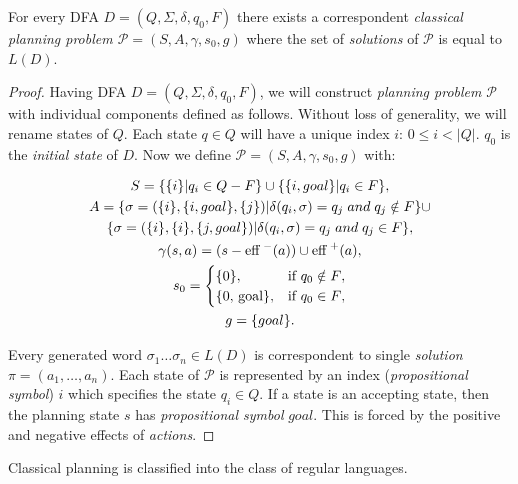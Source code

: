 \begin{thm}\label{thm02:2}
    For every DFA $D = (Q, \Sigma, \delta, q_0, F)$ there exists a correspondent \emph{classical planning problem $\mathcal{P} = (S, A, \gamma, s_0, g)$} where the set of \emph{solutions} of $\mathcal{P}$ is equal to $L(D)$.
\end{thm}
\begin{proof}
    Having DFA $D = (Q, \Sigma, \delta, q_0, F)$, we will construct \emph{planning problem} $\mathcal{P}$ with individual components defined as follows. Without loss of generality, we will rename states of $Q$. Each state $q \in Q$ will have a unique index $i$: $0 \leq i < |Q|$. $q_0$ is the \emph{initial state} of $D$. Now we define $\mathcal{P} = (S, A, \gamma, s_0, g)$ with:

    \begin{gather*}
        S = \{{\{i\} | q_i \in Q - F}\} \cup \{{\{i, goal\} | q_i \in F}\}, \\
        A = \{ \sigma = ( \{i\}, \{i, goal\}, \{j\} ) | \delta(q_i,\sigma) = q_j \; and \; q_j \notin F\} \cup \\ \{ \sigma = ( \{i\}, \{i\}, \{j, goal\} ) | \delta(q_i,\sigma) = q_j \; and \; q_j \in F\}, \\
        \gamma(s,a)=(s-\text{eff}^{\,\,-}(a)) \cup \text{eff}^{\,\,+}(a), \\
        s_0 = 
            \begin{cases}
                $\{0\}$, & \text{if $q_0 \notin F$},\\
                $\{0, goal\}$, & \text{if $q_0 \in F$},
            \end{cases} \\
        g = \{ goal \}.
    \end{gather*}

    Every generated word $\sigma_1\dots\sigma_n \in L(D)$ is correspondent to single \emph{solution} $\pi = (a_1, \dots, a_n)$. Each state of $\mathcal{P}$ is represented by an index (\emph{propositional symbol}) $i$ which specifies the state $q_i \in Q$. If a state is an accepting state, then the planning state $s$ has \emph{propositional symbol} $goal$. This is forced by the positive and negative effects of \emph{actions}.
\end{proof}

\begin{cor}\label{cor2:1}
    Classical planning is classified into the class of regular languages.
\end{cor}

